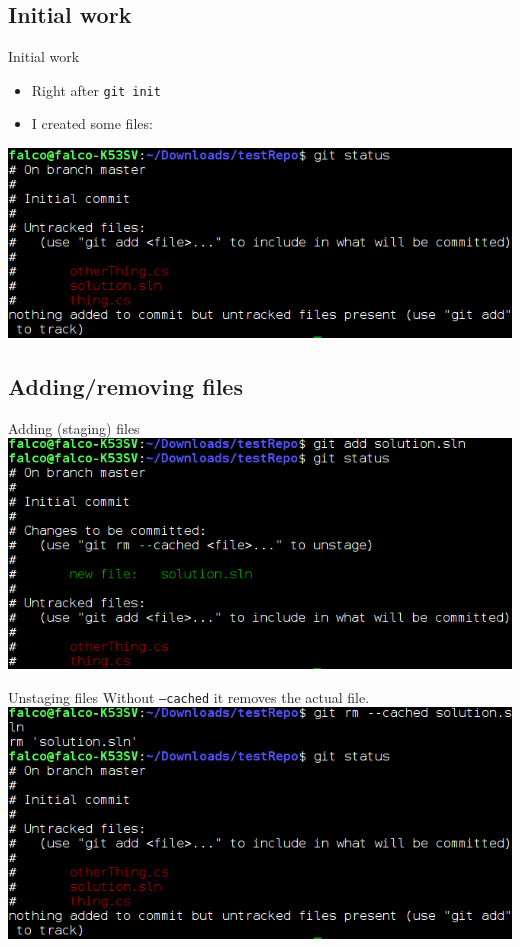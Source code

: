 \documentclass[10pt,a4paper]{beamer}
\begin{document}
\subsection{Initial work}
\begin{frame}{Initial work}
\begin{itemize}
\item Right after \texttt{git init}
\item I created some files:
\end{itemize}

\includegraphics[width=\linewidth]{gitStatus1.png}
\end{frame}

\subsection{Adding/removing files}
\begin{frame}{Adding (staging) files}
\includegraphics[width=\linewidth]{gitAdd.png}
\end{frame}

\begin{frame}{Unstaging files}
Without \texttt{--cached} it removes the actual file.
\includegraphics[width=\linewidth]{gitrmcached.png}
\end{frame}
\end{document}
